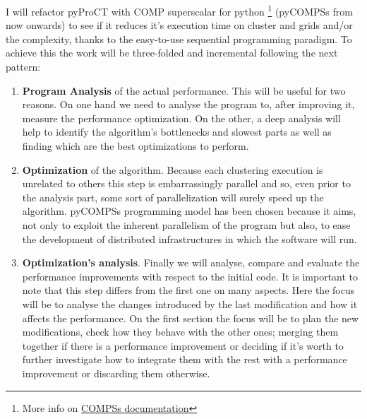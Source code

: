 I will refactor pyProCT with COMP superscalar for python \footnote{ More info on \hyperref[subsec:compss_doc]{COMPSs documentation}} (pyCOMPSs from now onwards) to see if it reduces it's execution time on cluster and grids and/or the complexity, thanks to  the easy-to-use sequential programming paradigm. To achieve this the work will be three-folded and incremental following the next pattern:
\begin{enumerate}
\item \textbf{Program Analysis} of the actual performance. This will be useful for two reasons. On one hand we need to analyse the program to, after improving it, measure the performance optimization. On the other, a deep analysis will help to identify the algorithm's bottlenecks and slowest parts as well as finding which are the best optimizations to perform.
\item \textbf{Optimization} of the algorithm. Because each clustering execution is unrelated to others this step is embarrassingly parallel and so, even prior to the analysis part, some sort of parallelization will surely speed up the algorithm. pyCOMPSs programming model has been chosen because it aims, not only to exploit the inherent parallelism of the program but also, to ease the development of distributed infrastructures in which the software will run. 
\item \textbf{Optimization's analysis}. Finally we will analyse, compare and evaluate the performance improvements with respect to the initial code. It is important to note that this step differs from the first one on many aspects. Here the focus will be to analyse the changes introduced by the last modification and how it affects the performance. On the first section the focus will be to plan the new modifications, check how they behave with the other ones; merging them together if there is a performance improvement or deciding if it's worth to further investigate how to integrate them with the rest with a performance improvement or discarding them otherwise.
\end{enumerate}

